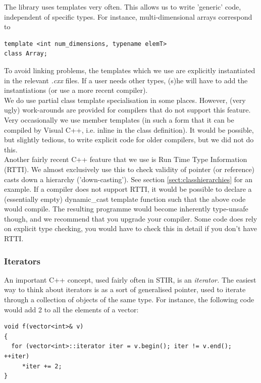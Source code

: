 \documentclass{article}
\begin{document}
The library uses templates very often. This allows us to write 
'generic' code, independent of specific types. For instance, 
multi-dimensional arrays correspond to 

\begin{verbatim}
template <int num_dimensions, typename elemT>
class Array;
\end{verbatim}


To avoid linking problems, the templates which we use are explicitly 
instantiated in the relevant \textit{.cxx} files. If a user needs 
other types, (s)he will have to add the instantiations (or use 
a more recent compiler).\\
We do use partial class template specialisation in some places. 
However, (very ugly) work-arounds are provided for compilers 
that do not support this feature.\\
Very occasionally we use member templates (in such a form that 
it can be compiled by Visual C++, i.e. inline in the class definition). 
It would be possible, but slightly tedious, to write explicit 
code for older compilers, but we did not do this.\\
Another fairly recent C++ feature that we use is Run Time Type 
Information (RTTI). We almost exclusively use this to check validity 
of pointer (or reference) casts down a hierarchy ('down-casting'). 
See section \ref{sect:classhierarchies} 
for an example. If a compiler does not support 
RTTI, it would be possible to declare a (essentially empty) {\small dynamic\_cast} 
template function such that the above code would compile. The 
resulting programme would become inherently type-unsafe though, 
and we recommend that you upgrade your compiler. Some code does 
rely on explicit type checking, you would have to check this 
in detail if you don't have RTTI.

\subsubsection{
Iterators}

An important C++ concept, used fairly often in STIR, is an \textit{iterator.} The 
easiest way to think about iterators is as a sort of generalised 
pointer, used to iterate through a collection of objects of the 
same type. For instance, the following code would add 2 to all 
the elements of a vector:

\begin{verbatim}
void f(vector<int>& v)
{
  for (vector<int>::iterator iter = v.begin(); iter != v.end(); ++iter)
     *iter += 2;
}
\end{verbatim}
\end{document}
